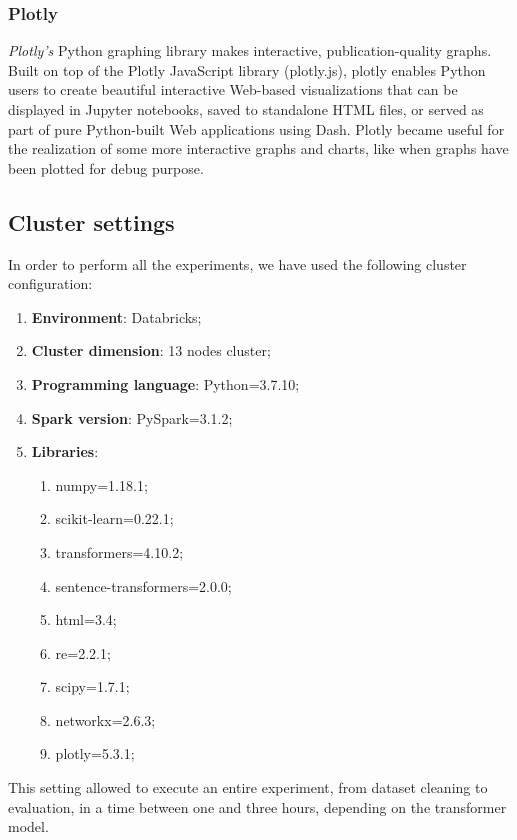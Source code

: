 \documentclass[\main/main.tex]{subfiles}
\begin{document}
\subsubsection{Plotly}
\emph{Plotly's} \cite{plotly} Python graphing library makes interactive, publication-quality graphs. Built on top of the Plotly JavaScript library (plotly.js), plotly enables Python users to create beautiful interactive Web-based visualizations that can be displayed in Jupyter notebooks, saved to standalone HTML files, or served as part of pure Python-built Web applications using Dash. Plotly became useful for the realization of some more interactive graphs and charts, like when graphs have been plotted for debug purpose.
\subsection{Cluster settings}
In order to perform all the experiments, we have used the following cluster configuration:
\begin{enumerate}
    \item \textbf{Environment}: Databricks;
    \item \textbf{Cluster dimension}: 13 nodes cluster;
    \item \textbf{Programming language}: Python=3.7.10;
    \item \textbf{Spark version}: PySpark=3.1.2;
    \item \textbf{Libraries}: 
        \begin{enumerate}
            \item numpy=1.18.1;
            \item scikit-learn=0.22.1;
            \item transformers=4.10.2;
            \item sentence-transformers=2.0.0;
            \item html=3.4;
            \item re=2.2.1;
            \item scipy=1.7.1;
            \item networkx=2.6.3;
            \item plotly=5.3.1;
        \end{enumerate}
\end{enumerate}
This setting allowed to execute an entire experiment, from dataset cleaning to evaluation, in a time between one and three hours, depending on the transformer model.
\end{document}
